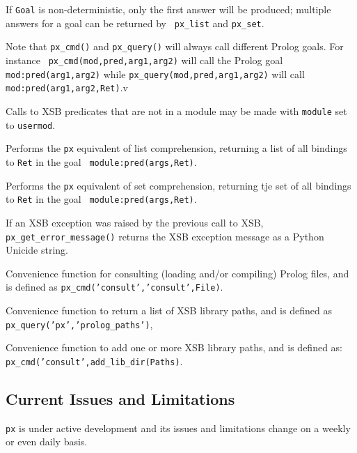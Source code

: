\begin{description}
     If {\tt Goal} is non-deterministic, only the first answer will be
     produced; multiple answers for a goal can be returned by {\tt
       px\_list} and {\tt px\_set}.

     Note that {\tt px\_cmd()} and {\tt px\_query()} will always call
     different Prolog goals.  For instance {\tt
       px\_cmd(mod,pred,arg1,arg2)} will call the Prolog goal {\tt
       mod:pred(arg1,arg2)} while {\tt px\_query(mod,pred,arg1,arg2)}
     will call {\tt mod:pred(arg1,arg2,Ret)}.v
     
     Calls to XSB predicates that are not in a module may be made with
     {\tt module} set to {\tt usermod}.

%
  Performs the {\tt px} equivalent of list comprehension, returning a
  list of all bindings to {\tt Ret} in the goal {\tt
    module:pred(args,Ret)}.
  
%
  Performs the {\tt px} equivalent of set comprehension, returning tje
  set of all bindings to {\tt Ret} in the goal {\tt
    module:pred(args,Ret)}.

%
  If an XSB exception was raised by the previous call to XSB, {\tt
    px\_get\_error\_message()} returns the XSB exception message as a
  Python Unicide string.
  
%
  Convenience function for consulting (loading and/or compiling)
  Prolog files, and is defined as 
  {\tt px\_cmd('consult','consult',File)}.

%  
  Convenience function to return a list of XSB library paths, and is
  defined as {\tt px\_query('px','prolog\_paths')},

%  
    Convenience function to add one or more XSB library paths, and is
    defined as: {\tt px\_cmd('consult',add\_lib\_dir(Paths)}.
  
\end{description}

\subsection{Current Issues and Limitations}

{\tt px} is under active development and its issues and limitations
change on a weekly or even daily basis.

